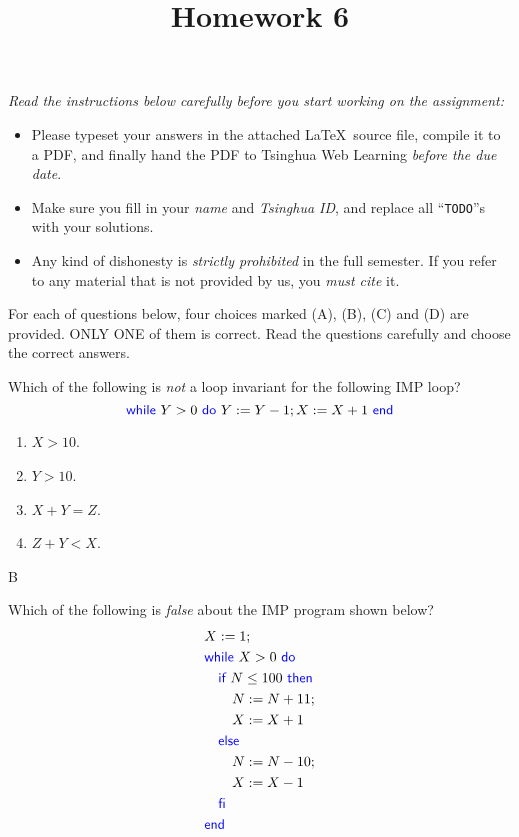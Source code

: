 \documentclass[11pt,a4paper]{article}
\title{Homework 6}
\newcommand{\kword}[1]{{\color{blue} \textsf{#1}}}
\newcommand{\If}{\kword{if}}
\newcommand{\Then}{\kword{then}}
\newcommand{\Else}{\kword{else}}
\newcommand{\Fi}{\kword{fi}}
\newcommand{\While}{\kword{while}}
\newcommand{\Do}{\kword{do}}
\newcommand{\End}{\kword{end}}
\begin{document}
\maketitle

\textit{Read the instructions below carefully before you start working on the assignment:}
\begin{itemize}
    \item Please typeset your answers in the attached \LaTeX~source file, compile it to a PDF,
    and finally hand the PDF to Tsinghua Web Learning \emph{before the due date}.
    \item Make sure you fill in your \emph{name} and \emph{Tsinghua ID},
    and replace all ``\texttt{TODO}''s with your solutions.
    \item Any kind of dishonesty is \emph{strictly prohibited} in the full semester.
    If you refer to any material that is not provided by us, you \emph{must cite} it.
\end{itemize}


For each of questions below, four choices marked (A), (B), (C) and (D) are provided.
ONLY ONE of them is correct. Read the questions carefully and choose the correct answers.

\subproblem Which of the following is \emph{not} a loop invariant for the following IMP loop? $$\While~Y>0~\Do~Y:=Y-1;X:=X+1~\End$$

\begin{enumerate}[label=(\Alph*)]
    \item $X>10$.
    \item $Y>10$.
    \item $X+Y=Z$.
    \item $Z+Y<X$.
\end{enumerate}

\begin{solution}
    B
\end{solution}

\subproblem Which of the following is \emph{false} about the IMP program shown below?
\begin{align*}
    & X := 1; \\
    & \While~X > 0~\Do \\
	&\quad \If~N \le 100~\Then \\
	&\qquad N := N + 11; \\
	&\qquad X := X + 1 \\
	&\quad \Else \\
	&\qquad N := N - 10; \\
	&\qquad X := X - 1 \\
	&\quad \Fi \\
    & \End
\end{align*}
\end{document}
